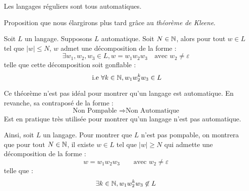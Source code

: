 \begin{proposition}
    Les langages réguliers sont tous automatiques. 
\end{proposition}

Proposition que nous élargirons plus tard grâce au \emph{théorème de Kleene}. 

\begin{theorem}
    Soit $L$ un langage. Supposons $L$ automatique. 
    Soit $N \in \mathbb{N}$, alors pour tout $w \in L$ tel que $ |w| \leqslant N$, $w$ admet une décomposition 
    de la forme : 
        \[\exists w_1, w_2, w_3 \in L, w = w_1 w_2 w_3 \quad \text{avec } w_2 \not  = \varepsilon \]
    telle que cette décomposition soit gonflable :
        \[ \text{ i.e } \forall k \in \mathbb{N}, w_1 w_2 ^k w_3 \in L \]
\end{theorem} 

Ce théorème n'est pas idéal pour montrer qu'un langage est automatique. En revanche, sa contraposé de la forme :
    \[ \boxed{\text{Non Pompable } \Longrightarrow \text{Non Automatique}} \]  
Est en pratique très utilisée pour montrer qu'un langage n'est pas automatique. 

\begin{proposition}
    Ainsi, soit $L$ un langage. Pour montrer que $L$ n'est pas pompable, on montrera que 
    pour tout $N \in \mathbb{N}$, il existe $w \in L$ tel que $ |w| \geqslant N$ qui admette une décomposition de la forme : 
        \[ w = w_1 w_2 w_3 \quad \quad \text{avec } w_2 \not  = \varepsilon \] 
    telle que : 
        \[ \exists k \in \mathbb{N}, w_1 w_2^k w_3 \not \in L \] 
\end{proposition}


